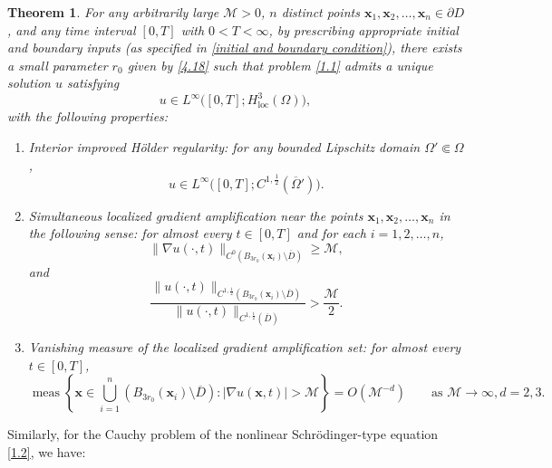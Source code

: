 \documentclass[11pt,reqno,oneside]{amsart}
\numberwithin{equation}{section}
\newtheorem{theorem}{Theorem}[section]
\theoremstyle{definition}
\theoremstyle{remark}
\numberwithin{equation}{section}
\begin{document}
\begin{theorem}\label{thm:main}
For any arbitrarily large $\mathcal{M} > 0$, $n$ distinct points $\mathbf{x}_1,\mathbf{x}_2,\ldots,\mathbf{x}_n \in \partial D$, and any time interval $[0,T]$ with $0 < T < \infty$, by prescribing appropriate initial and boundary inputs (as specified in \eqref{initial and boundary condition}), there exists a small parameter $r_0$ given by \eqref{4.18} such that problem \eqref{1.1} admits a unique solution $u$ satisfying
\[
u \in L^{\infty}\big([0,T];H^{3}_{\mathrm{loc}}(\Omega)\big),
\]
with the following properties:
\begin{enumerate}
    \item \textit{Interior improved H\"older regularity}: for any bounded Lipschitz domain $\Omega' \Subset \Omega$,
    \[
    u \in L^{\infty}\big([0,T]; C^{1,\frac{1}{2}}(\overline{\Omega}')\big).
    \]

    \item \textit{Simultaneous localized gradient amplification near the points}
    $\mathbf{x}_1,\mathbf{x}_2,\ldots,\mathbf{x}_n$ \textit{in the following sense}: for almost every $t \in [0,T]$ and for each $i=1,2,\ldots,n$,
    \begin{equation*}
        \|\nabla u(\cdot,t)\|_{C^{0}\!\left(B_{3r_0}(\mathbf{x}_i)\setminus\overline{D}\right)}
        \ge \mathcal{M},
    \end{equation*}
    and
    \begin{equation*}
        \frac{\|u(\cdot,t)\|_{C^{1,\frac12}\!\left(B_{3r_0}(\mathbf{x}_i)\setminus\overline{D}\right)}}
        {\|u(\cdot,t)\|_{C^{1,\frac12}(\overline{D})}}
        > \frac{\mathcal{M}}{2}.
    \end{equation*}

    \item \textit{Vanishing measure of the localized gradient amplification set}: for almost every $t \in [0,T]$,
    \begin{equation*}
        \operatorname{meas}\left\{
        \mathbf{x} \in \bigcup_{i=1}^{n}\left(B_{3r_0}(\mathbf{x}_i)\setminus \overline{D}\right)
        : |\nabla u(\mathbf{x},t)| > \mathcal{M}
        \right\}
        = O(\mathcal{M}^{-d})
        \qquad \text{as } \mathcal{M}\to\infty,d=2, 3.
    \end{equation*}
\end{enumerate}
\end{theorem}

Similarly, for the Cauchy problem of the nonlinear Schr\"odinger-type equation \eqref{1.2}, we have:
\end{document}
